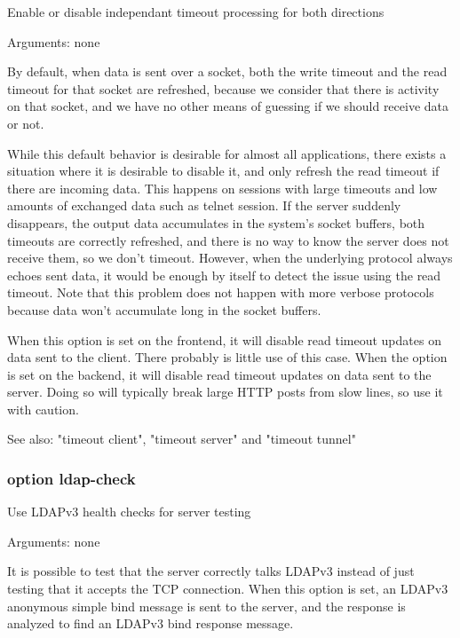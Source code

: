
  Enable or disable independant timeout processing for both directions


  Arguments: none

  By default, when data is sent over a socket, both the write timeout and the
  read timeout for that socket are refreshed, because we consider that there is
  activity on that socket, and we have no other means of guessing if we should
  receive data or not.

  While this default behavior is desirable for almost all applications, there
  exists a situation where it is desirable to disable it, and only refresh the
  read timeout if there are incoming data. This happens on sessions with large
  timeouts and low amounts of exchanged data such as telnet session. If the
  server suddenly disappears, the output data accumulates in the system's
  socket buffers, both timeouts are correctly refreshed, and there is no way
  to know the server does not receive them, so we don't timeout. However, when
  the underlying protocol always echoes sent data, it would be enough by itself
  to detect the issue using the read timeout. Note that this problem does not
  happen with more verbose protocols because data won't accumulate long in the
  socket buffers.

  When this option is set on the frontend, it will disable read timeout updates
  on data sent to the client. There probably is little use of this case. When
  the option is set on the backend, it will disable read timeout updates on
  data sent to the server. Doing so will typically break large HTTP posts from
  slow lines, so use it with caution.

  See also: "timeout client", "timeout server" and "timeout tunnel"

\subsubsection{option ldap-check}


  Use LDAPv3 health checks for server testing


  Arguments: none

  It is possible to test that the server correctly talks LDAPv3 instead of just
  testing that it accepts the TCP connection. When this option is set, an
  LDAPv3 anonymous simple bind message is sent to the server, and the response
  is analyzed to find an LDAPv3 bind response message.

